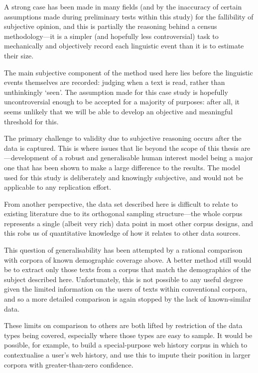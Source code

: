 A strong case has been made in many fields (and by the inaccuracy of certain assumptions made during preliminary tests within this study) for the fallibility of subjective opinion, and this is partially the reasoning behind a census methodology---it is a simpler (and hopefully less controversial) task to mechanically and objectively record each linguistic event than it is to estimate their size.

The main subjective component of the method used here lies before the linguistic events themselves are recorded: judging when a text is read, rather than unthinkingly `seen'.  The assumption made for this case study is hopefully uncontroversial enough to be accepted for a majority of purposes: after all, it seems unlikely that we will be able to develop an objective and meaningful threshold for this.

The primary challenge to validity due to subjective reasoning occurs after the data is captured.  This is where issues that lie beyond the scope of this thesis are---development of a robust and generalisable human interest model being a major one that has been shown to make a large difference to the results.  The model used for this study is deliberately and knowingly subjective, and would not be applicable to any replication effort.

From another perspective, the data set described here is difficult to relate to existing literature due to its orthogonal sampling structure---the whole corpus represents a single (albeit very rich) data point in most other corpus designs, and this robs us of quantitative knowledge of how it relates to other data sources.

This question of generalisability has been attempted by a rational comparison with corpora of known demographic coverage above.  A better method still would be to extract only those texts from a corpus that match the demographics of the subject described here.  Unfortunately, this is not possible to any useful degree given the limited information on the users of texts within conventional corpora, and so a more detailed comparison is again stopped by the lack of known-similar data.

These limits on comparison to others are both lifted by restriction of the data types being covered, especially where those types are easy to sample.  It would be possible, for example, to build a special-purpose web history corpus in which to contextualise a user's web history, and use this to impute their position in larger corpora with greater-than-zero confidence.






